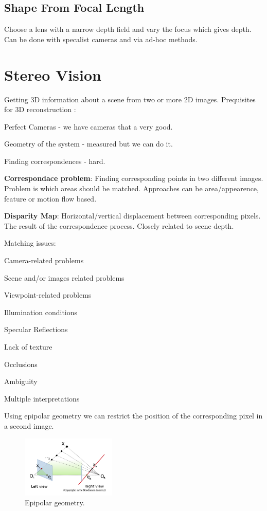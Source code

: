 \documentclass[8pt]{extarticle}
\begin{document}
\begin{multicols}{2}
\subsection{Shape From Focal Length}
Choose a lens with a narrow depth field and vary the focus which gives depth. Can be done with specalist cameras and via ad-hoc methods.

\section{Stereo Vision}
Getting 3D information about a scene from two or more 2D images. Prequisites for 3D reconstruction :

\begin{compactitem}
    \item Perfect Cameras - we have cameras that a very good.
    \item Geometry of the system - measured but we can do it.
    \item Finding correspondences - hard.
\end{compactitem}

\textbf{Correspondace problem}: Finding corresponding points in two different images. Problem is which areas should be matched. Approaches can be area/appearence, feature or motion flow based.

\textbf{Disparity Map}: Horizontal/vertical displacement between corresponding pixels. The result of the correspondence process. Closely related to scene depth.

Matching issues:
\begin{compactitem}
    \item Camera-related problems
    \item Scene and/or images related problems
    \item Viewpoint-related problems
    \item Illumination conditions
    \item Specular Reflections
    \item Lack of texture
    \item Occlusions
    \item Ambiguity
    \item Multiple interpretations
\end{compactitem}

Using epipolar geometry we can restrict the position of the corresponding pixel in a second image.
\begin{figure}[H]
    \centering
    \includegraphics[width=0.4\textwidth]{epipolar_geometry.png}
    \caption{Epipolar geometry.}
    \label{fig:epipolar-geometry}
\end{figure}


\end{multicols}
\end{document}
